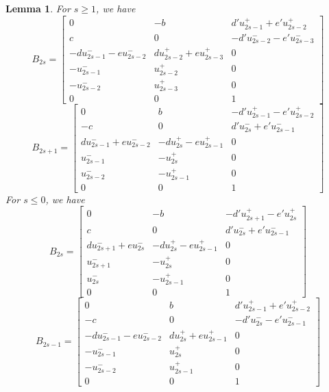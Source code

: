 \documentclass{amsart}
\newtheorem{lemma}[theorem]{Lemma}
\numberwithin{theorem}{section}
\begin{document}
  \begin{lemma}
    For $s\ge 1$, we have 
    \[B_{2s}=\left[\begin{array}{ccc} 0 & -b & d'u_{2s-1}^+ + e'u_{2s-2}^+ \\ c & 0 & -d'u_{2s-2}^- - e'u_{2s-3}^-\\ -du_{2s-1}^- - eu_{2s-2}^- &  du_{2s-2}^+ + eu_{2s-3}^+ & 0\\ -u_{2s-1}^- & u_{2s-2}^+ & 0\\ -u_{2s-2}^- & u_{2s-3}^+ & 0\\ 0 & 0 & 1\end{array}\right]\]
    \[B_{2s+1}=\left[\begin{array}{ccc} 0 & b & -d'u_{2s-1}^+ - e'u_{2s-2}^+ \\ -c & 0 & d'u_{2s}^- + e'u_{2s-1}^-\\ du_{2s-1}^- + eu_{2s-2}^- & -du_{2s}^+ - eu_{2s-1}^+ & 0\\ u_{2s-1}^- & -u_{2s}^+ & 0\\ u_{2s-2}^- & -u_{2s-1}^+ & 0\\ 0 & 0 & 1\end{array}\right]\]
    For $s\le 0$, we have
    \[B_{2s}=\left[\begin{array}{ccc} 0 & -b & -d'u_{2s+1}^+ - e'u_{2s}^+ \\ c & 0 & d'u_{2s}^- + e'u_{2s-1}^-\\ du_{2s+1}^- + eu_{2s}^- &  -du_{2s}^+ - eu_{2s-1}^+ & 0\\ u_{2s+1}^- & -u_{2s}^+ & 0\\ u_{2s}^- & -u_{2s-1}^+ & 0\\ 0 & 0 & 1\end{array}\right]\]
    \[B_{2s-1}=\left[\begin{array}{ccc} 0 & b & d'u_{2s-1}^+ + e'u_{2s-2}^+ \\ -c & 0 & -d'u_{2s}^- - e'u_{2s-1}^-\\ -du_{2s-1}^- - eu_{2s-2}^- & du_{2s}^+ + eu_{2s-1}^+ & 0\\ -u_{2s-1}^- & u_{2s}^+ & 0\\ -u_{2s-2}^- & u_{2s-1}^+ & 0\\ 0 & 0 & 1\end{array}\right]\]
  \end{lemma}
\end{document}
